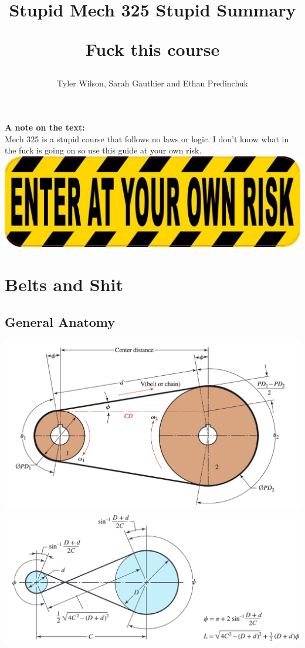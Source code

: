 \documentclass[11pt, fleqn]{article}
\begin{document}
\allowdisplaybreaks

\title{Stupid Mech 325 Stupid Summary\\ \vspace{-0.4cm}\begin{tiny}Fuck this course\end{tiny}}
\author{Tyler Wilson, Sarah Gauthier and Ethan Predinchuk}
\date{}

\maketitle
\tableofcontents

\textbf{A note on the text:}\\
Mech 325 is a stupid course that follows no laws or logic. I don't know what in the fuck is going on so use this guide at your own risk.\\
\includegraphics[scale = 0.3]{Caution.png}
\section{Belts and Shit}
\subsection{General Anatomy}
\includegraphics[scale=0.6]{Belts/configuration.png}\\
\includegraphics[scale=0.45]{Gears/Twist.png}\\
\end{document}
